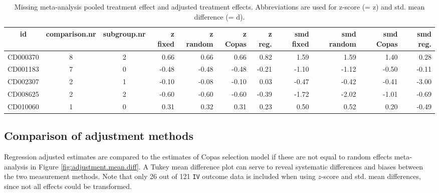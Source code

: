 \documentclass[11pt,a4paper,twoside]{book}\usepackage[]{graphicx}\usepackage[]{color}
\begin{document}
\begin{table}[ht]
\centering
\begingroup\tiny
\begin{tabular}{cccrrrrrrrr}
  \hline
id & comparison.nr & subgroup.nr & z fixed & z random & z Copas & z reg. & smd fixed & smd random & smd Copas & smd reg. \\ 
  \hline
CD000370 & 8 & 2 & 0.66 & 0.66 & 0.66 & 0.82 & 1.59 & 1.59 & 1.40 & 0.28 \\ 
  CD001183 & 7 & 0 & -0.48 & -0.48 & -0.48 & -0.21 & -1.10 & -1.12 & -0.50 & -0.11 \\ 
  CD002307 & 2 & 1 & -0.10 & -0.08 & -0.10 & 0.03 & -0.47 & -0.42 & -0.41 & -3.00 \\ 
  CD008625 & 2 & 2 & -0.60 & -0.60 & -0.60 & -0.39 & -1.72 & -2.02 & -1.01 & -0.69 \\ 
  CD010060 & 1 & 0 & 0.31 & 0.32 & 0.31 & 0.23 & 0.50 & 0.52 & 0.20 & -0.49 \\ 
   \hline
\end{tabular}
\endgroup
\caption{Missing meta-analysis pooled treatment effect and adjusted treatment effects. Abbreviations are used for z-score (= z) and std. mean difference (= d).} 
\label{missing.differences}
\end{table}



\subsection{Comparison of adjustment methods}
Regression adjusted estimates are compared to the estimates of Copas selection model if these are not equal to random effects meta-analysis in Figure \ref{fig:adjustment.mean.diff}. A Tukey mean difference plot can serve to reveal systematic differences and biases between the two measurement methods. Note that only 26 out of 121 \texttt{IV} outcome data is included when using $z$-score and std. mean differences, since not all effects could be transformed.
\end{document}
